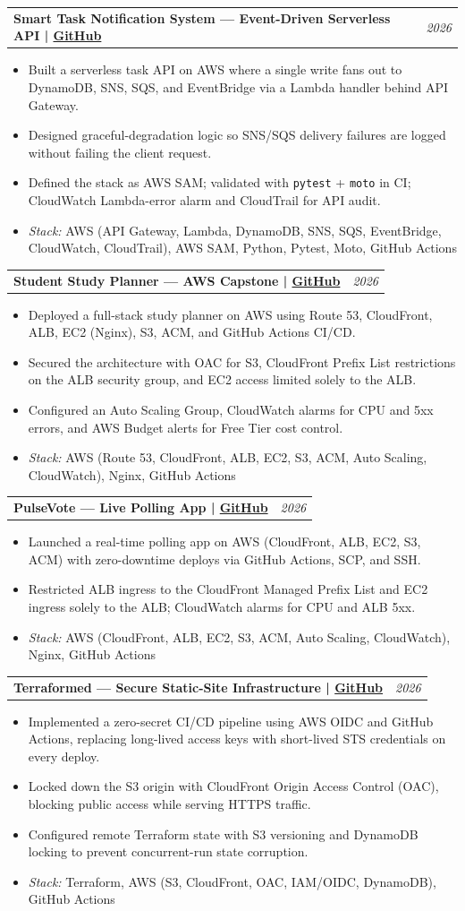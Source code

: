 \documentclass[letterpaper,11pt]{article}
\makeatletter
\newcommand{\resumeItem}[1]{\item\small{#1\vspace{-1pt}}}
\newcommand{\resumeProjectHeading}[2]{%
  \vspace{-2pt}\item
  \begin{tabular*}{1.0\textwidth}[t]{l@{\extracolsep{\fill}}r}
    \textbf{#1} & \textit{\small #2} \\
  \end{tabular*}\vspace{-7pt}
}
\newcommand{\resumeItemListStart}{\begin{itemize}[leftmargin=0.15in]}
\newcommand{\resumeItemListEnd}{\end{itemize}\vspace{-5pt}}
\makeatother
\begin{document}
  \resumeProjectHeading
    {Smart Task Notification System --- Event-Driven Serverless API \textnormal{|} \href{https://github.com/GeekKwame/SmartTaskNotificationSystem}{\small GitHub}}{2026}
  \resumeItemListStart
    \resumeItem{Built a serverless task API on AWS where a single write fans out to DynamoDB, SNS, SQS, and EventBridge via a Lambda handler behind API Gateway.}
    \resumeItem{Designed graceful-degradation logic so SNS/SQS delivery failures are logged without failing the client request.}
    \resumeItem{Defined the stack as AWS SAM; validated with \texttt{pytest} + \texttt{moto} in CI; CloudWatch Lambda-error alarm and CloudTrail for API audit.}
    \resumeItem{\textit{Stack:} AWS (API Gateway, Lambda, DynamoDB, SNS, SQS, EventBridge, CloudWatch, CloudTrail), AWS SAM, Python, Pytest, Moto, GitHub Actions}
  \resumeItemListEnd

  \resumeProjectHeading
    {Student Study Planner --- AWS Capstone \textnormal{|} \href{https://github.com/GeekKwame/student-student-planner}{\small GitHub}}{2026}
  \resumeItemListStart
    \resumeItem{Deployed a full-stack study planner on AWS using Route 53, CloudFront, ALB, EC2 (Nginx), S3, ACM, and GitHub Actions CI/CD.}
    \resumeItem{Secured the architecture with OAC for S3, CloudFront Prefix List restrictions on the ALB security group, and EC2 access limited solely to the ALB.}
    \resumeItem{Configured an Auto Scaling Group, CloudWatch alarms for CPU and 5xx errors, and AWS Budget alerts for Free Tier cost control.}
    \resumeItem{\textit{Stack:} AWS (Route 53, CloudFront, ALB, EC2, S3, ACM, Auto Scaling, CloudWatch), Nginx, GitHub Actions}
  \resumeItemListEnd

  \resumeProjectHeading
    {PulseVote --- Live Polling App \textnormal{|} \href{https://github.com/GeekKwame/pulsevote}{\small GitHub}}{2026}
  \resumeItemListStart
    \resumeItem{Launched a real-time polling app on AWS (CloudFront, ALB, EC2, S3, ACM) with zero-downtime deploys via GitHub Actions, SCP, and SSH.}
    \resumeItem{Restricted ALB ingress to the CloudFront Managed Prefix List and EC2 ingress solely to the ALB; CloudWatch alarms for CPU and ALB 5xx.}
    \resumeItem{\textit{Stack:} AWS (CloudFront, ALB, EC2, S3, ACM, Auto Scaling, CloudWatch), Nginx, GitHub Actions}
  \resumeItemListEnd

  \resumeProjectHeading
    {Terraformed --- Secure Static-Site Infrastructure \textnormal{|} \href{https://github.com/GeekKwame/terraformed-project}{\small GitHub}}{2026}
  \resumeItemListStart
    \resumeItem{Implemented a zero-secret CI/CD pipeline using AWS OIDC and GitHub Actions, replacing long-lived access keys with short-lived STS credentials on every deploy.}
    \resumeItem{Locked down the S3 origin with CloudFront Origin Access Control (OAC), blocking public access while serving HTTPS traffic.}
    \resumeItem{Configured remote Terraform state with S3 versioning and DynamoDB locking to prevent concurrent-run state corruption.}
    \resumeItem{\textit{Stack:} Terraform, AWS (S3, CloudFront, OAC, IAM/OIDC, DynamoDB), GitHub Actions}
  \resumeItemListEnd
\end{document}
